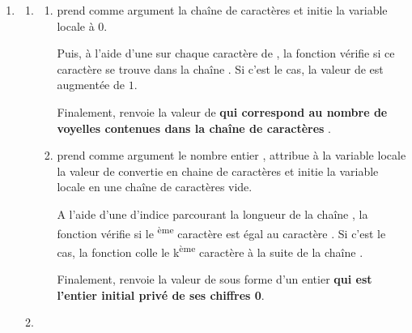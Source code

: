 \begin{enumerate}[label=\thechapter.\arabic*., font=\bfseries, itemsep=10mm,labelsep*=3mm,left=0mm]
\begin{enumerate}[label=\alph*),itemsep=3mm]
\item \begin{minipage}[t][][b]{1\textwidth}
\end{minipage}

\item Oui, on peut utiliser la formule $\sum^{n}_{j=1}j^2=\frac{n(n+1)(2n+1)}{6}$.
\end{enumerate}



\item
\vspace{-5mm}
\begin{enumerate}[label=\alph*),itemsep=3mm]
\item 
\begin{enumerate}[label=\roman*)]
\item {} prend comme argument la chaîne de caractères  et initie la variable locale  à 0.

\smallskip
Puis, à l'aide d'une \boup sur chaque caractère de , la fonction vérifie si ce caractère se trouve dans la chaîne  . Si c'est le cas, la valeur de  est augmentée de $1$.

\smallskip
Finalement,  renvoie la valeur de  \textbf{qui correspond au nombre de voyelles contenues dans la chaîne de caractères }.\clearpage


\item {} prend comme argument le nombre entier , attribue à la variable locale  la valeur de  convertie en chaine de caractères et initie la variable locale  en une chaîne de caractères vide.

\smallskip
A l'aide d'une \boup d'indice  parcourant la longueur de la chaîne , la fonction vérifie si le \textsuperscript{ème} caractère est égal au caractère . Si c'est le cas, la fonction colle le k\textsuperscript{ème} caractère à la suite de la chaîne .

\smallskip
Finalement,  renvoie la valeur de  sous forme d'un entier \textbf{qui est l'entier initial privé de ses chiffres 0}.
\end{enumerate} 


\item\begin{minipage}[t][][b]{1\textwidth}
\vspace{-4mm}
\end{minipage}
\end{enumerate} 




\end{enumerate}
